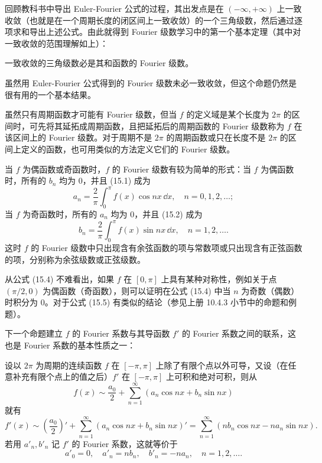 回顾教科书中导出 Euler-Fourier 公式的过程，其出发点是在 $(-\infty,+\infty)$ 上一致收敛（也就是在一个周期长度的闭区间上一致收敛）的一个三角级数，然后通过逐项求和导出上述公式。由此就得到 Fourier 级数学习中的第一个基本定理（其中对一致收敛的范围理解如上）：

\begin{xproposition}[15.1.1]
一致收敛的三角级数必是其和函数的 Fourier 级数。
\end{xproposition}

虽然用 Euler-Fourier 公式得到的 Fourier 级数未必一致收敛，但这个命题仍然是很有用的一个基本结果。

\begin{xremark}
虽然只有周期函数才可能有 Fourier 级数，但当 $f$ 的定义域是某个长度为 $2\pi$ 的区间时，可先将其延拓成周期函数，且把延拓后的周期函数的 Fourier 级数称为 $f$ 在该区间上的 Fourier 级数。对于周期不是 $2\pi$ 的周期函数或只在长度不是 $2\pi$ 的区间上定义的函数，也可用类似的方法定义它们的 Fourier 级数。
\end{xremark}

\begin{xremark}
当 $f$ 为偶函数或奇函数时，$f$ 的 Fourier 级数有较为简单的形式：当 $f$ 为偶函数时，所有的 $b_n$ 均为 0，并且 (15.1) 成为
\begin{equation}
  a_n=\frac2\pi\int_0^{\pi}f(x)\cos nx\,\dd x,\quad n=0,1,2,\ldots;
  \tag{15.4}
  \label{eq:15.4}
\end{equation}
当 $f$ 为奇函数时，所有的 $a_n$ 均为 0，并且 (15.2) 成为
\begin{equation}
  b_n=\frac2\pi\int_0^{\pi}f(x)\sin nx\,\dd x,\quad n=1,2,\ldots.
  \tag{15.5}
  \label{eq:15.5}
\end{equation}
这时 $f$ 的 Fourier 级数中只出现含有余弦函数的项与常数项或只出现含有正弦函数的项，分别称为余弦级数或正弦级数。
\end{xremark}

\begin{xremark}
从公式 (15.4) 不难看出，如果 $f$ 在 $[0,\pi]$ 上具有某种对称性，例如关于点 $(\pi/2,0)$ 为偶函数（奇函数），则可以证明在公式 (15.4) 中当 $n$ 为奇数（偶数）时积分为 0。对于公式 (15.5) 有类似的结论（参见上册 10.4.3 小节中的命题和例题）。
\end{xremark}

下一个命题建立 $f$ 的 Fourier 系数与其导函数 $f'$ 的 Fourier 系数之间的联系，这也是 Fourier 系数的基本性质之一：

\begin{xproposition}[15.1.2]
设以 $2\pi$ 为周期的连续函数 $f$ 在 $[-\pi,\pi]$ 上除了有限个点以外可导，又设（在任意补充有限个点上的值之后）$f'$ 在 $[-\pi,\pi]$ 上可积和绝对可积，则从
\[
  f(x)\sim\frac{a_0}{2}+\sum_{n=1}^{\infty}(a_n\cos nx+b_n\sin nx)
\]
就有
\[
  f'(x)\sim\left(\frac{a_0}{2}\right)'+\sum_{n=1}^{\infty}(a_n\cos nx+b_n\sin nx)'
  =\sum_{n=1}^{\infty}(nb_n\cos nx-na_n\sin nx).
\]
若用 $a'_n,b'_n$ 记 $f'$ 的 Fourier 系数，这就等价于
\begin{equation}
  a'_0=0,\quad a'_n=nb_n,\quad b'_n=-na_n,\quad n=1,2,\ldots.
  \tag{15.6}
  \label{eq:15.6}
\end{equation}
\end{xproposition}

